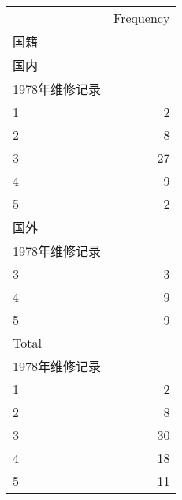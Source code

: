 \begin{tabular}{ll}
\cline{1-2}
\multicolumn{1}{c}{} &
  \multicolumn{1}{|r}{Frequency} \\
\cline{1-2}
\multicolumn{1}{l}{国籍} &
  \multicolumn{1}{|r}{} \\
\multicolumn{1}{l}{\hspace{1em}国内} &
  \multicolumn{1}{|r}{} \\
\multicolumn{1}{l}{\hspace{2em}1978年维修记录} &
  \multicolumn{1}{|r}{} \\
\multicolumn{1}{l}{\hspace{3em}1} &
  \multicolumn{1}{|r}{2} \\
\multicolumn{1}{l}{\hspace{3em}2} &
  \multicolumn{1}{|r}{8} \\
\multicolumn{1}{l}{\hspace{3em}3} &
  \multicolumn{1}{|r}{27} \\
\multicolumn{1}{l}{\hspace{3em}4} &
  \multicolumn{1}{|r}{9} \\
\multicolumn{1}{l}{\hspace{3em}5} &
  \multicolumn{1}{|r}{2} \\
\multicolumn{1}{l}{\hspace{1em}国外} &
  \multicolumn{1}{|r}{} \\
\multicolumn{1}{l}{\hspace{2em}1978年维修记录} &
  \multicolumn{1}{|r}{} \\
\multicolumn{1}{l}{\hspace{3em}3} &
  \multicolumn{1}{|r}{3} \\
\multicolumn{1}{l}{\hspace{3em}4} &
  \multicolumn{1}{|r}{9} \\
\multicolumn{1}{l}{\hspace{3em}5} &
  \multicolumn{1}{|r}{9} \\
\multicolumn{1}{l}{\hspace{1em}Total} &
  \multicolumn{1}{|r}{} \\
\multicolumn{1}{l}{\hspace{2em}1978年维修记录} &
  \multicolumn{1}{|r}{} \\
\multicolumn{1}{l}{\hspace{3em}1} &
  \multicolumn{1}{|r}{2} \\
\multicolumn{1}{l}{\hspace{3em}2} &
  \multicolumn{1}{|r}{8} \\
\multicolumn{1}{l}{\hspace{3em}3} &
  \multicolumn{1}{|r}{30} \\
\multicolumn{1}{l}{\hspace{3em}4} &
  \multicolumn{1}{|r}{18} \\
\multicolumn{1}{l}{\hspace{3em}5} &
  \multicolumn{1}{|r}{11} \\
\cline{1-2}
\end{tabular}
